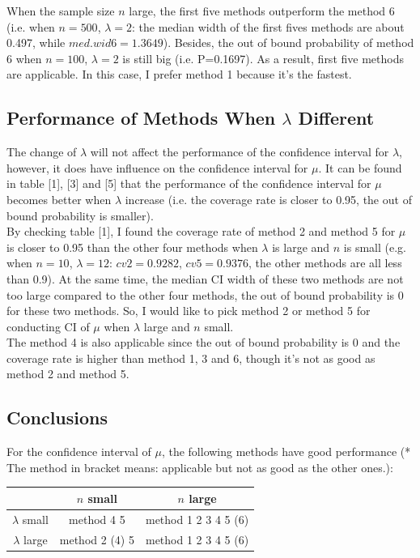 \documentclass[12pt]{article}
\begin{document}
When the sample size $n$ large, the first five methods outperform the method 6 (i.e. when $n=500$, $\lambda=2$: the median width of the first fives methods are about 0.497, while $med.wid6 = 1.3649$). Besides, the out of bound probability of method 6 when $n=100$, $\lambda=2$ is still big (i.e. P=0.1697). As a result, first five methods are applicable. In this case, I prefer method 1 because it's the fastest.\\

\subsection{Performance of Methods When $\lambda$ Different}
The change of $\lambda$ will not affect the performance of the confidence interval for $\lambda$, however, it does have influence on the confidence interval for $\mu$. It can be found in table [1], [3] and [5] that the performance of the confidence interval for $\mu$ becomes better when $\lambda$ increase (i.e. the coverage rate is closer to 0.95, the out of bound probability is smaller).  \\

By checking table [1], I found the coverage rate of method 2 and method 5 for $\mu$ is closer to 0.95 than the other four methods when $\lambda$ is large and $n$ is small (e.g. when $n=10$, $\lambda=12$: $cv2=0.9282$, $cv5=0.9376$, the other methods are all less than 0.9). At the same time, the median CI width of these two methods are not too large compared to the other four methods, the out of bound probability is 0 for these two methods. So, I would like to pick method 2 or method 5 for conducting CI of $\mu$ when $\lambda$ large and $n$ small. \\

The method 4 is also applicable since the out of bound probability is 0 and the coverage rate is higher than method 1, 3 and 6, though it's not as good as method 2 and method 5.\\

\subsection{Conclusions}

For the confidence interval of $\mu$, the following methods have good performance (* The method in bracket means: applicable but not as good as the other ones.):\\

\begin{tabular}{|c|c|c|}
\hline
  & $n$ small & $n$ large\\
 \hline
$\lambda$ small & method 4  5 &  method 1 2 3 4 5 (6)\\
$\lambda$ large & method 2 (4) 5 & method 1 2 3 4 5 (6)\\
\hline
\end{tabular}
\\
\\
\end{document}
